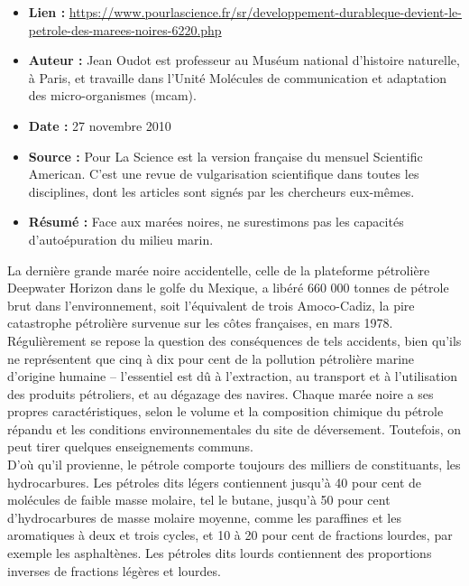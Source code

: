 \documentclass[8pt]{article}
\begin{document}
\begin{itemize}
	\item \textbf{Lien : }  \url{https://www.pourlascience.fr/sr/developpement-durableque-devient-le-petrole-des-marees-noires-6220.php} 
	\item \textbf{Auteur : } Jean Oudot est professeur au Muséum national d'histoire naturelle, à Paris, et travaille dans l'Unité Molécules de communication et adaptation des micro-organismes (mcam).	
	\item \textbf{Date : }  27 novembre 2010
	\item \textbf{Source : } Pour La Science est la version française du mensuel Scientific American. C'est une revue de vulgarisation scientifique dans toutes les disciplines, dont les articles sont signés par les chercheurs eux-mêmes.
	\item \textbf{Résumé : } Face aux marées noires, ne surestimons pas les capacités d'autoépuration du milieu marin.
	
\end{itemize}

La dernière grande marée noire accidentelle, celle de la plateforme pétrolière Deepwater Ho­rizon dans le golfe du Mexi­que, a libéré 660 000 tonnes de pétrole brut dans l'environnement, soit l'équivalent de trois Amoco-Cadiz, la pire catastrophe pétrolière survenue sur les côtes françaises, en mars 1978. Régulièrement se repose la question des conséquences de tels accidents, bien qu'ils ne représentent que cinq à dix pour cent de la pollution pétrolière marine d'origine humaine – l'essentiel est dû à l'extraction, au transport et à l'utilisation des produits pétroliers, et au dégazage des navires. Chaque marée noire a ses propres caractéristiques, selon le volume et la composition chimique du pétrole répandu et les conditions environnementales du site de déversement. Toutefois, on peut tirer quelques enseignements communs.\\

D'où qu'il provienne, le pétrole comporte toujours des milliers de constituants, les hydrocarbures. Les pétroles dits légers contiennent jusqu'à 40 pour cent de molécules de faible masse molaire, tel le butane, jusqu'à 50 pour cent d'hydrocarbures de masse molaire moyenne, comme les paraffines et les aromatiques à deux et trois cycles, et 10 à 20 pour cent de fractions lourdes, par exemple les asphaltènes. Les pétroles dits lourds contiennent des proportions inverses de fractions légères et lourdes.\\
\end{document}
